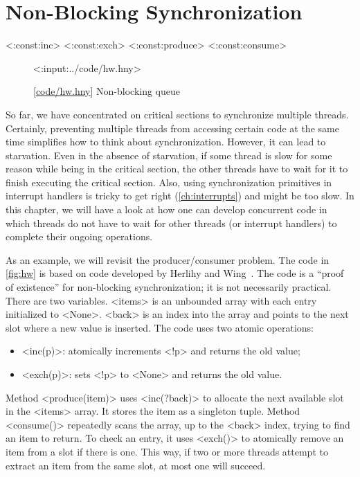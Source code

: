 \documentclass{report}
\newcommand{\harmonylink}[1]{%
[\href{https://harmony.cs.cornell.edu/#1}{\underline{#1}}]%
}
\newenvironment{code}{
\tcolorbox
}{
\endtcolorbox
}
\begin{document}
\chapter{Non-Blocking Synchronization}
\label{ch:nonblocking}
%

<{:const:inc}>
<{:const:exch}>
<{:const:produce}>
<{:const:consume}>

%

\begin{figure}
\begin{code}
<{:input:../code/hw.hny}>
\end{code}
\caption{\harmonylink{code/hw.hny} Non-blocking queue}
\label{fig:hw}
\end{figure}

So far, we have concentrated on critical sections to synchronize multiple
threads.  Certainly, preventing multiple threads from accessing
certain code at the same time simplifies how to think about synchronization.
However, it can lead to starvation.  Even in the absence of starvation,
if some thread is slow for some reason while being in the critical section,
the other threads have to wait for it to finish executing the critical section.
Also, using synchronization primitives in interrupt handlers is tricky
to get right (\autoref{ch:interrupts}) and might be too slow.
In this chapter, we will have a look at how one can develop concurrent
code in which threads do not have to wait for other threads (or interrupt
handlers) to complete their ongoing operations.

As an example, we will revisit the producer/consumer problem.
The code in \autoref{fig:hw} is based on code developed by Herlihy and
Wing~\cite{HW87}.
The code is a ``proof of existence'' for non-blocking synchronization; it
is not necessarily practical.
There are two variables.  <{items}> is an unbounded array with each
entry initialized to <{None}>.  <{back}> is an index into the
array and points to the next slot where a new value is inserted.
The code uses two atomic operations:
\begin{itemize}
\item <{inc(p)}>: atomically increments <{!p}> and returns
the old value;
\item <{exch(p)}>: sets <{!p}> to <{None}> and returns the old value.
\end{itemize}

Method <{produce(item)}> uses <{inc(?back)}> to allocate
the next available slot in the <{items}> array.
It stores the item as a singleton tuple.
Method <{consume()}> repeatedly scans the array, up to the
<{back}> index, trying to find an item to return.
To check an entry, it uses <{exch()}>
to atomically remove an item from a slot if there is one.
This way, if two or more threads attempt to extract an item from
the same slot, at most one will succeed.
\end{document}
